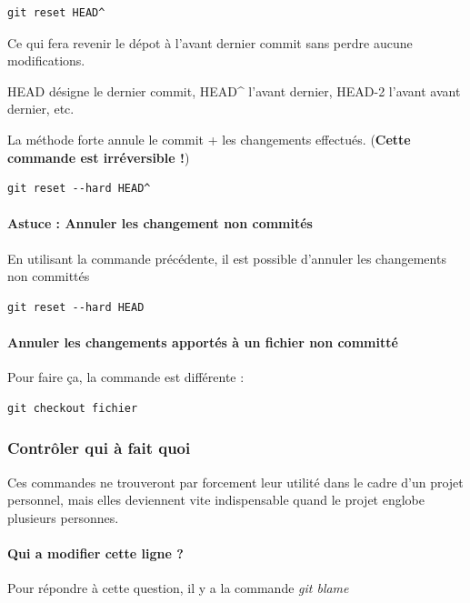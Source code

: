 \documentclass[a4paper]{article}
\begin{document}
\begin{verbatim}
git reset HEAD^
\end{verbatim}
Ce qui fera revenir le dépot à l'avant dernier commit sans perdre aucune modifications.

HEAD désigne le dernier commit, HEAD\^{} l'avant dernier, HEAD-2 l'avant avant dernier, etc.

La méthode forte annule le commit + les changements effectués. (\textbf{Cette commande est irréversible !})

\begin{verbatim}
git reset --hard HEAD^
\end{verbatim}

\paragraph{Astuce : Annuler les changement non commités} En utilisant la commande précédente, il est possible d'annuler les changements non committés

\begin{verbatim}
git reset --hard HEAD
\end{verbatim}

\paragraph{Annuler les changements apportés à un fichier non committé} Pour faire ça, la commande est différente :

\begin{verbatim}
git checkout fichier
\end{verbatim}

\subsubsection{Contrôler qui à fait quoi}

Ces commandes ne trouveront par forcement leur utilité dans le cadre d'un projet personnel, mais elles deviennent vite indispensable quand le projet englobe plusieurs personnes.

\paragraph{Qui a modifier cette ligne ?} Pour répondre à cette question, il y a la commande \emph{git blame}
\end{document}
